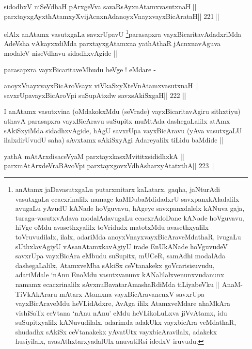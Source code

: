 \begin{shl}
sidodhxV niSeVdhaH pArxgeVva savaRsAyxnAtamxvasutxnaH ||
parxtayxgAyxthAtamxyXvijAcnxnAdanoyxVnayxvayxBicArataH\hfill || 221 ||
\end{shl}

\begin{artha}
elAlx anAtamx vasutxgaLa savxrUpavU \footnote[1]{anAtamx
  jaDavasutxgaLu putarxmitarx kaLatarx, gaqha, jaNturAdi vasutxgaLa
  ecacxrinalilx namage kaMDubaMdidadxrU savxpanxkAladalilx avugaLu
  yAvudU kANade hoVguvavu, hAgeye savxpanxdalelx kANuva gaja,
  turaga-vasutxvAdava modalAdavugaLu ecacxrAdoDane kANade hoVguvavu,
  hiVge oMdu avasethxyalilx toVridudx matotxMdu avasethxyalilx
  toVruvudilalx, ilalx, adariMda anoyxVnayxvayxBicAraveMdathaR,
  ivugaLu sUthxlavAgiyU vAsanAtamxkavAgiyU irade EnUkANade hoVguvudeV
  savxrUpa vayxBicAra eMbudu suSupitx, mUCeR, samAdhi modalAda
  dashegaLalilx, AtamxveMba sAkiSx ceVtanakekx goVcarisisuvudu,
  adariMdale `nAnu EnoMdu vasutxvanunx kANalilalxvenunxvudanunx namamx
  ecacxrinalilx sAvxnuBavatarAmashaRdiMda tiLiyabeVku ||
  AnaM-TiVkAkAraru mAtarx Atamxna vayxBicAravanenxV savxrUpa
  vayxBicAraveMdu heVLidAdxre, AvAga ililx AtamxveMdare ahaMkAra
  vishiSaTx ceVtana `nAnu nAnu' eMdu heVLikoLuLxva jiVvAtamx, idu
  suSupitxyalilx kANuvudilalx, adarimda adakUkx vayxbicAra veMdathaR,
  shudadhx sAkiSx ceVtanakekx yAvatUtx vayxbicAravilalx, adakekx
  husiyilalx, avasAthxtarxyadalUlx anuvatiRsi idedxV iruvudu.}parasapxra
vayxBicaritavAdadxriMda AdeVsha vAkayxxdiMda parxtayxgAtamxna
yathAthaR jAcnxnavAguva modaleV niseVdhavu sidadhxvAgide ||

parasapxra vayxBicaritaveMbudu heVge ! eMdare -
\end{artha}

\begin{shl}
\footnotemark[1]anoyxVnayxvayxBicAroV\s sayx viVkaSxyXteV\s nAtamxvasutxnaH ||
savxrUpavayxBicAroV\s pi suSupAtxdw savxsAkiSxgaH\hfill || 222 ||
\end{shl}

\begin{artha}
I anAtamx vasutxvina (oMdakokxMdu (seVrade) vayxBicaritavAgiru
sithxtiyu) athavA parasapxra vayxBicAravu suSupitx muMtAda
dashegaLalilx atAmx sAkiSxyiMda sidadhxvAgide, hAgU savxrUpa
vayxBicAravu (yAva vasutxgaLU ilalxdirUvudU saha) sAvxtamx sAkiSxyAgi
Adareyalilx tiLidu baMdide ||
\end{artha}

\begin{shl}
yathA mAtArxdisaceVyaM parxtayxkasxMvititxsididhxkA ||
parxmAtArxdeVraBAvoV\s pi parxtayxgovxVdhAsharxyAtatxthA\hfill || 223 ||
\end{shl}

